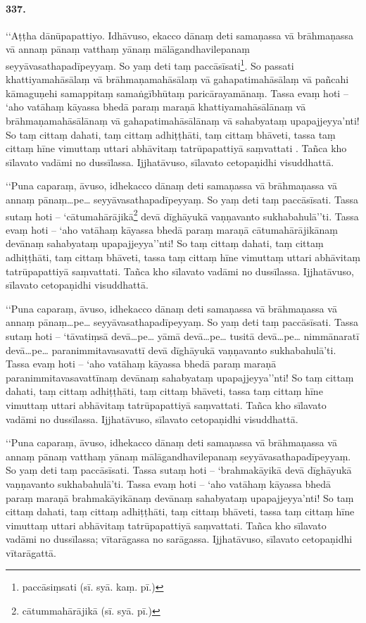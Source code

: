 \paragraph{337.} ‘‘Aṭṭha dānūpapattiyo. Idhāvuso, ekacco dānaṃ deti samaṇassa vā brāhmaṇassa vā annaṃ pānaṃ vatthaṃ yānaṃ mālāgandhavilepanaṃ seyyāvasathapadīpeyyaṃ. So yaṃ deti taṃ paccāsīsati\footnote{paccāsiṃsati (sī. syā. kaṃ. pī.)}. So passati khattiyamahāsālaṃ vā brāhmaṇamahāsālaṃ vā gahapatimahāsālaṃ vā pañcahi kāmaguṇehi samappitaṃ samaṅgībhūtaṃ paricārayamānaṃ. Tassa evaṃ hoti – ‘aho vatāhaṃ kāyassa bhedā paraṃ maraṇā khattiyamahāsālānaṃ vā brāhmaṇamahāsālānaṃ vā gahapatimahāsālānaṃ vā sahabyataṃ upapajjeyya’nti! So taṃ cittaṃ dahati, taṃ cittaṃ adhiṭṭhāti, taṃ cittaṃ bhāveti, tassa taṃ cittaṃ hīne vimuttaṃ uttari abhāvitaṃ tatrūpapattiyā saṃvattati . Tañca kho sīlavato vadāmi no dussīlassa. Ijjhatāvuso, sīlavato cetopaṇidhi visuddhattā.

‘‘Puna caparaṃ, āvuso, idhekacco dānaṃ deti samaṇassa vā brāhmaṇassa vā annaṃ pānaṃ…pe… seyyāvasathapadīpeyyaṃ. So yaṃ deti taṃ paccāsīsati. Tassa sutaṃ hoti – ‘cātumahārājikā\footnote{cātummahārājikā (sī. syā. pī.)} devā dīghāyukā vaṇṇavanto sukhabahulā’’ti. Tassa evaṃ hoti – ‘aho vatāhaṃ kāyassa bhedā paraṃ maraṇā cātumahārājikānaṃ devānaṃ sahabyataṃ upapajjeyya’’nti! So taṃ cittaṃ dahati, taṃ cittaṃ adhiṭṭhāti, taṃ cittaṃ bhāveti, tassa taṃ cittaṃ hīne vimuttaṃ uttari abhāvitaṃ tatrūpapattiyā saṃvattati. Tañca kho sīlavato vadāmi no dussīlassa. Ijjhatāvuso, sīlavato cetopaṇidhi visuddhattā.

‘‘Puna caparaṃ, āvuso, idhekacco dānaṃ deti samaṇassa vā brāhmaṇassa vā annaṃ pānaṃ…pe… seyyāvasathapadīpeyyaṃ. So yaṃ deti taṃ paccāsīsati. Tassa sutaṃ hoti – ‘tāvatiṃsā devā…pe… yāmā devā…pe… tusitā devā…pe… nimmānaratī devā…pe… paranimmitavasavattī devā dīghāyukā vaṇṇavanto sukhabahulā’ti. Tassa evaṃ hoti – ‘aho vatāhaṃ kāyassa bhedā paraṃ maraṇā paranimmitavasavattīnaṃ devānaṃ sahabyataṃ upapajjeyya’’nti! So taṃ cittaṃ dahati, taṃ cittaṃ adhiṭṭhāti, taṃ cittaṃ bhāveti, tassa taṃ cittaṃ hīne vimuttaṃ uttari abhāvitaṃ tatrūpapattiyā saṃvattati. Tañca kho sīlavato vadāmi no dussīlassa. Ijjhatāvuso, sīlavato cetopaṇidhi visuddhattā.

‘‘Puna caparaṃ, āvuso, idhekacco dānaṃ deti samaṇassa vā brāhmaṇassa vā annaṃ pānaṃ vatthaṃ yānaṃ mālāgandhavilepanaṃ seyyāvasathapadīpeyyaṃ. So yaṃ deti taṃ paccāsīsati. Tassa sutaṃ hoti – ‘brahmakāyikā devā dīghāyukā vaṇṇavanto sukhabahulā’ti. Tassa evaṃ hoti – ‘aho vatāhaṃ kāyassa bhedā paraṃ maraṇā brahmakāyikānaṃ devānaṃ sahabyataṃ upapajjeyya’nti! So taṃ cittaṃ dahati, taṃ cittaṃ adhiṭṭhāti, taṃ cittaṃ bhāveti, tassa taṃ cittaṃ hīne vimuttaṃ uttari abhāvitaṃ tatrūpapattiyā saṃvattati. Tañca kho sīlavato vadāmi no dussīlassa; vītarāgassa no sarāgassa. Ijjhatāvuso, sīlavato cetopaṇidhi vītarāgattā.

